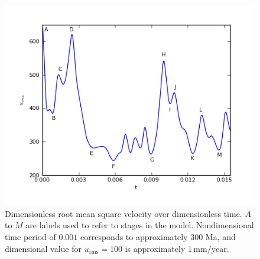 \begin{figure}
  \begin{center}
   \includegraphics[width=0.95\columnwidth]{chapters/vynnytska/png/u_rms.png}
    \caption{Dimensionless root mean square velocity over
    dimensionless time. $A$ to $M$ are labels used to refer to stages
    in the model. Nondimensional time period of $0.001$ corresponds to
    approximately 300 Ma, and dimensional value for $u_{\mathrm{rms}} = 100$ is
    approximately $1\,\mathrm{mm/year}$.}
  \end{center}
\label{vynnytska:fig:rms_velocity}
\end{figure}

